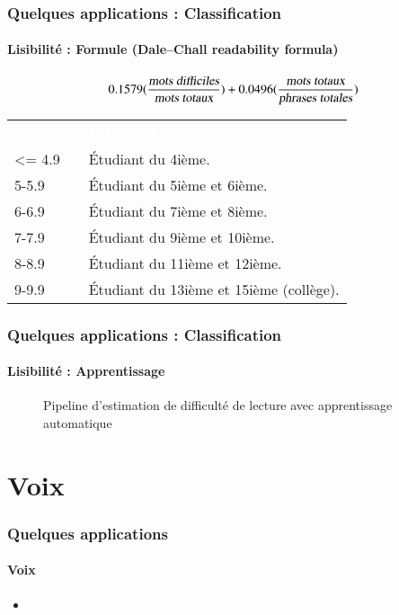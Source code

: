 \documentclass[xcolor=table]{beamer}
\begin{document}
\begin{frame}
	\frametitle{Quelques applications : Classification}
	\framesubtitle{Lisibilité : Formule (Dale–Chall readability formula)}
	\[
	0.1579 (\frac{\text{\slshape mots difficiles}}{\text{\slshape mots totaux}})
	+ 0.0496 (\frac{\text{\slshape mots totaux}}{\text{\slshape phrases totales}})
	\]
	
	\begin{center}
		\footnotesize
		\begin{tabular}{p{}lp{}}
			\rowcolor{darkblue}
			\bfseries\textcolor{white}{Score} && \bfseries\textcolor{white}{Difficulté}\\
			\textless= 4.9 && Étudiant du 4ième. \\
			5-5.9 && Étudiant du 5ième et 6ième. \\
			6-6.9 && Étudiant du 7ième et 8ième.\\
			7-7.9 && Étudiant du 9ième et 10ième. \\
			8-8.9 && Étudiant du 11ième et 12ième. \\
			9-9.9 && Étudiant du 13ième et 15ième (collège). \\
		\end{tabular}
	\end{center}
	
\end{frame}

\begin{frame}
	\frametitle{Quelques applications : Classification}
	\framesubtitle{Lisibilité : Apprentissage}
	
	\begin{figure}
		\centering
		\caption{Pipeline d'estimation de difficulté de lecture avec apprentissage automatique \cite{2014-collins}}
	\end{figure}
	
\end{frame}

\section{Voix}

\begin{frame}
	\frametitle{Quelques applications}
	\framesubtitle{Voix}
	\begin{itemize}
		\item 
	\end{itemize}
\end{frame}
\end{document}
